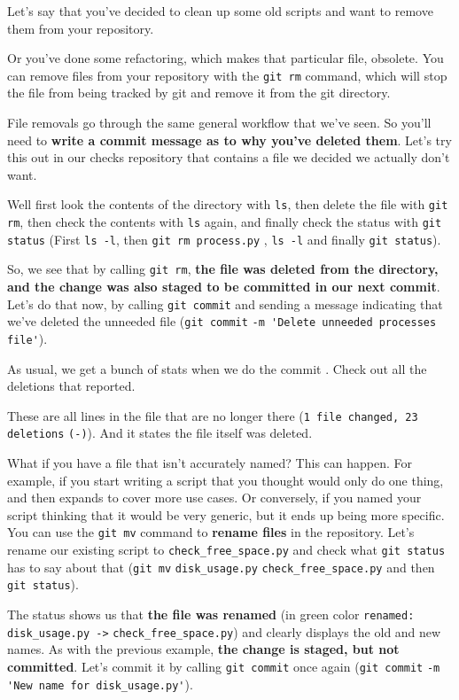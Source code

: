 	Let's say that you've decided to clean up some old scripts and want to remove them from your repository.
	
	Or you've done some refactoring, which makes that particular file, obsolete. You can remove files from your repository with the \texttt{git rm} command, which will stop the file from being tracked by git and remove it from the git directory.
	
	File removals go through the same general workflow that we've seen. So you'll need to \textbf{write a commit message as to why you've deleted them}. Let's try this out in our checks repository that contains a file we decided we actually don't want. 
	
	Well first look the contents of the directory with \texttt{ls}, then delete the file with \texttt{git rm}, then check the contents with \texttt{ls} again, and finally check the status with \texttt{git status} (First \verb|ls -l|, then \verb|git rm process.py| , \verb|ls -l| and finally \verb|git status|).
	
	So, we see that by calling \texttt{git rm}, \textbf{the file was deleted from the directory, and the change was also staged to be committed in our next commit}. Let's do that now, by calling \texttt{git commit} and sending a message indicating that we've deleted the unneeded file (\texttt{git commit} \verb|-m 'Delete unneeded processes file'|).
	
	As usual, we get a bunch of stats when we do the commit . Check out all the deletions that reported.
		
	These are all lines in the file that are no longer there (\texttt{1 file changed, 23 deletions} \verb|(-)|). And it states the file itself was deleted. 
	
	What if you have a file that isn't accurately named? This can happen. For example, if you start writing a script that you thought would only do one thing, and then expands to cover more use cases. Or conversely, if you named your script thinking that it would be very generic, but it ends up being more specific. You can use the \texttt{git mv} command to \textbf{rename files} in the repository. Let's rename our existing script to \verb|check_free_space.py| and check what \texttt{git status} has to say about that (\texttt{git mv} \verb|disk_usage.py| \verb|check_free_space.py| and then \texttt{git status}).
	
	The status shows us that \textbf{the file was renamed} (in green color \texttt{renamed: } \verb|disk_usage.py ->| \verb|check_free_space.py|) and clearly displays the old and new names. As with the previous example, \textbf{the change is staged, but not committed}. Let's commit it by calling \texttt{git commit} once again (\texttt{git commit} \verb|-m| \verb|'New name for disk_usage.py'|).
	
